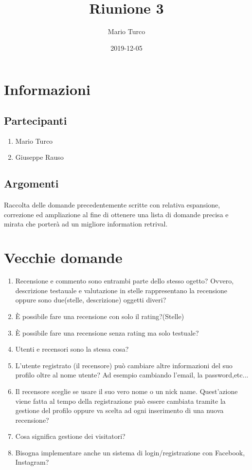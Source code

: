 \documentclass{article}
\title{Riunione 3}
\date{2019-12-05}
\author{Mario Turco}
\begin{document}
\maketitle
{}
\newpage
\tableofcontents
\newpage
{}
\section{Informazioni}
\subsection{Partecipanti}
\begin{enumerate}
    \item Mario Turco
    \item Giuseppe Rauso
\end{enumerate}
\subsection{Argomenti}
\paragraph{}
Raccolta delle domande precedentemente scritte con relativa espansione, correzione ed ampliazione al fine di 
ottenere una lista di domande precisa e mirata che porterà ad un migliore information retrival.
\section{Vecchie domande}
\begin{enumerate}
    \item Recensione e commento sono entrambi parte dello stesso ogetto? Ovvero, descrizione testauale e valutazione in stelle rappresentano la recensione oppure sono due(stelle, descrizione) oggetti diveri?
    \item È possibile fare una recensione con solo il rating?(Stelle)
    \item È possibile fare una recensione senza rating ma solo testuale?
    \item Utenti e recensori sono la stessa cosa?
    \item L'utente registrato (il recensore) può cambiare altre informazioni del suo profilo oltre al nome utente? Ad esempio cambiando l'email, la password,etc...
    \item Il recensore sceglie se usare il suo vero nome o un nick name. Quest'azione viene fatta al tempo della registrazione può essere cambiata tramite la gestione del profilo oppure va scelta ad ogni inserimento di una nuova recensione?
    \item Cosa significa gestione dei visitatori?
    \item Bisogna implementare anche un sistema di login/registrazione con Facebook, Instagram?
\end{enumerate}
\end{document}
